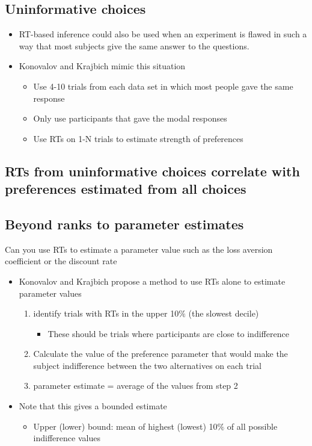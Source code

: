 \subsection{Uninformative choices}
\begin{itemize}
    \item RT-based inference could also be used when an experiment is flawed in such a way that most subjects give the same answer to the questions.
    \item Konovalov and Krajbich mimic this situation
    \begin{itemize}
        \item Use 4-10 trials from each data set in which most people gave the same response
        \item Only use participants that gave the modal responses
        \item Use RTs on 1-N trials to estimate strength of preferences
    \end{itemize}
\end{itemize}
\subsection{RTs from uninformative choices correlate with preferences estimated from all choices}
\subsection{Beyond ranks to parameter estimates}
Can you use RTs to estimate a parameter value such as the loss aversion coefficient or the discount rate
\begin{itemize}
    \item Konovalov and Krajbich propose a method to use RTs alone to estimate parameter values
    \begin{enumerate}
    \item identify trials with RTs in the upper 10$\%$ (the slowest decile)
        \begin{itemize}
        \item These should be trials where participants are close to indifference
    \end{itemize}
    \item Calculate the value of the preference parameter that would make the subject indifference between the two alternatives on each trial
    \item parameter estimate = average of the values from step 2
    
    \end{enumerate}
 \item Note that this gives a bounded estimate
 \begin{itemize}
     \item Upper (lower) bound: mean of highest (lowest) 10$\%$ of all possible indifference values
 \end{itemize}
\end{itemize}
